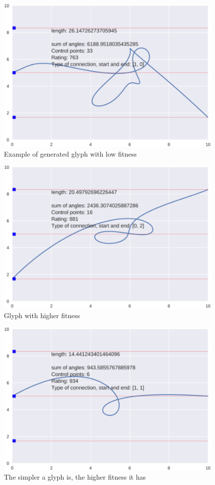 \documentclass[conference]{IEEEtran}
\begin{document}
\begin{figure}[tbp]
\centering
        \includegraphics[width=0.75\hsize]{e1.pdf}
\caption{Example of generated glyph with low fitness}
\end{figure}
\begin{figure}[tbp]
\centering
        \includegraphics[width=0.75\hsize]{e3.pdf}
\caption{Glyph with higher fitness      }
\end{figure}
\begin{figure}[tbp]
\centering
        \includegraphics[width=0.75\hsize]{e2.pdf}
\caption{The simpler a glyph is, the higher fitness it has}
\end{figure}
\end{document}
